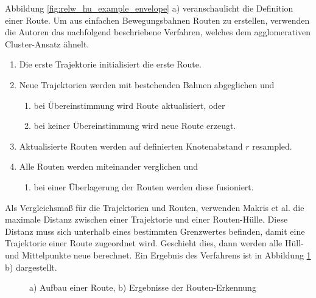 Abbildung \ref{fig:relw_hu_example_envelope} a) veranschaulicht die Definition einer Route.
Um aus einfachen Bewegungsbahnen Routen zu erstellen, verwenden die Autoren das nachfolgend beschriebene Verfahren,
welches dem agglomerativen Cluster-Ansatz ähnelt.

\begin{enumerate}
    \item Die erste Trajektorie initialisiert die erste Route.
    \item Neue Trajektorien werden mit bestehenden Bahnen abgeglichen und
    \begin{enumerate}
        \item bei Übereinstimmung wird Route aktualisiert, oder
        \item bei keiner Übereinstimmung wird neue Route erzeugt.
    \end{enumerate}
    \item Aktualisierte Routen werden auf definierten Knotenabstand $r$ resampled.
    \item Alle Routen werden miteinander verglichen und
    \begin{enumerate}
        \item bei einer Überlagerung der Routen werden diese fusioniert.
    \end{enumerate}
\end{enumerate}

Als Vergleichsmaß für die Trajektorien und Routen, verwenden Makris et al. die maximale Distanz zwischen einer Trajektorie und
einer Routen-Hülle. Diese Distanz muss sich unterhalb eines bestimmten Grenzwertes befinden, damit eine Trajektorie
einer Route zugeordnet wird. Geschieht dies, dann werden alle Hüll- und Mittelpunkte neue berechnet.
Ein Ergebnis des Verfahrens ist in Abbildung \ref{fig:relw_results_makris} b) dargestellt.

\begin{figure}[H]
    \centering
    \qquad
    \caption[Routen-Definition und Ergebnisse Routen-Erkennung (Makris et al.)]
            {a) Aufbau einer Route, b) Ergebnisse der Routen-Erkennung \cite[]{Makris2005}}
    \label{fig:relw_results_makris}
\end{figure}



